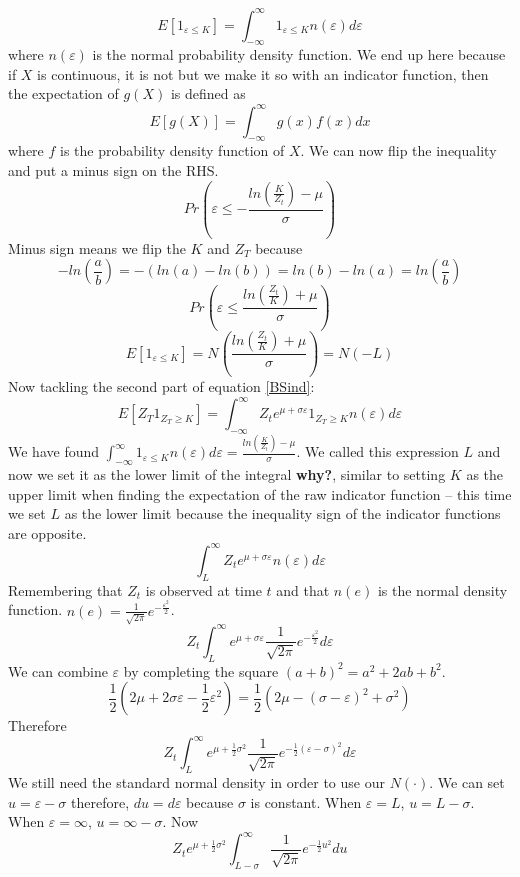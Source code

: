 \[
    E\left[ 1_{\varepsilon\leq K} \right] =
    \int_{-\infty}^{\infty} 1_{\varepsilon\leq K} n(\varepsilon)d\varepsilon
\]
where $n(\varepsilon)$ is the normal probability density function.
We end up here because if $X$ is continuous,
it is not but we make it so with an indicator function,
then the expectation of $g(X)$ is defined as
\[E[g(X)]=\int_{-\infty}^{\infty}g(x)f(x)dx\]
where $f$ is the probability density function of $X$.
We can now flip the inequality and put a minus sign on the RHS.
\[
    Pr\left( \varepsilon\leq -\frac{ln\left(\frac{K}{Z_t}\right)
    -\mu}{\sigma}\right)
\]
Minus sign means we flip the $K$ and $Z_T$ because
\[
    -ln\left(\frac{a}{b}\right) =-(ln(a)-ln(b))=ln(b)-ln(a)=
    ln\left(\frac{a}{b}\right)
\]
\[
    Pr\left( \varepsilon\leq\frac{ln\left(\frac{Z_t}{K}\right)
    +\mu}{\sigma}\right)
\]
\[
    E\left[ 1_{\varepsilon\leq K} \right] =
    N\left( \frac{ln\left(\frac{Z_t}{K}\right)
    +\mu}{\sigma}\right) =N(-L)
\]
Now tackling the second part of equation \ref{BSind}:
\[
    E\left[ Z_T1_{Z_T\geq K} \right] =
    \int_{-\infty}^{\infty}Z_te^{\mu+\sigma\varepsilon}1_{Z_T\geq
    K}n(\varepsilon)d\varepsilon
\]
We have found
$\int_{-\infty}^{\infty} 1_{\varepsilon\leq K}n(\varepsilon)d\varepsilon=
\frac{ln\left(\frac{K}{Z_t}\right)-\mu}{\sigma}$.
We called this expression $L$ and now we set it as the lower limit of the
integral \textbf{why?}, similar to setting $K$ as the upper limit when finding
the expectation of the raw indicator function --
this time we set $L$ as the lower limit because the inequality sign of the
indicator functions are opposite.
\[\int_{L}^{\infty}Z_te^{\mu+\sigma\varepsilon}n(\varepsilon)d\varepsilon\]
Remembering that $Z_t$ is observed at time $t$ and that $n(e)$ is the normal
density function.
$n(e)=\frac{1}{\sqrt{2\pi}}e^{-\frac{\varepsilon^2}{2}}$.
\[
    Z_t\int_{L}^{\infty}e^{\mu+\sigma\varepsilon}
    \frac{1}{\sqrt{2\pi}}e^{-\frac{\varepsilon^2}{2}}d\varepsilon
\]
We can combine $\varepsilon$ by completing the square
$(a+b)^2=a^2+2ab+b^2$.
\[
    \frac{1}{2}(2\mu+2\sigma\varepsilon-\frac{1}{2}\varepsilon^2)=
    \frac{1}{2}(2\mu-(\sigma-\varepsilon)^2+\sigma^2)
\]
Therefore
\[
    Z_t\int_{L}^{\infty}e^{\mu+\frac{1}{2}\sigma^2}
    \frac{1}{\sqrt{2\pi}}e^{-\frac{1}{2}(\varepsilon-\sigma)^2}d\varepsilon
\]
We still need the standard normal density in order to use our $N(\cdot)$.
We can set $u=\varepsilon-\sigma$ therefore, $du=d\varepsilon$ because $\sigma$
is constant.
When $\varepsilon=L$, $u=L-\sigma$.
When $\varepsilon=\infty$, $u=\infty-\sigma$.
Now
\[
    Z_te^{\mu+\frac{1}{2}\sigma^2}
    \int_{L-\sigma}^{\infty}\frac{1}{\sqrt{2\pi}}e^{-\frac{1}{2}u^2}du
\]
